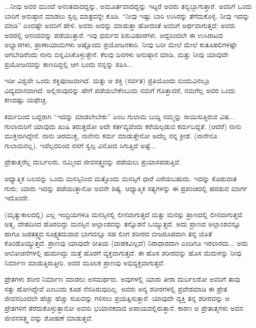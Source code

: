 ...ನೀವು ಅವರ ಮುಂದೆ ಅನಂತವಾದದ್ದನ್ನು, ಅಮೂರ್ತವಾದದ್ದನ್ನು ಇಟ್ಟರೆ ಅವರು ತಬ್ಬಿಬ್ಬಾಗುತ್ತಾರೆ. ಅವರಿಗೆ ಒಂದು ಬಾರಿಗೆ ಅನುಷ್ಠಾನ ಮಾಡಲು ಸ್ವಲ್ಪ ಮಾತ್ರವನ್ನೇ ಕೊಡಿ. “ನೀವು ಇಷ್ಟು ಬಾರಿ ಉಸಿರನ್ನು ತೆಗೆದುಕೊಳ್ಳಿ. ನೀವು ಇದನ್ನು ಮಾಡಿ'' ಎಂದಷ್ಟೇ ಅವರಿಗೆ ಹೇಳಿ. ಅವರು ಅದನ್ನು ಮಾಡುತ್ತಾ ಹೋದಂತೆ ಅವರಿಗೆ ಅರ್ಥವಾಗುತ್ತದೆ; ಅವರು ಅದರಲ್ಲಿ ಆನಂದವನ್ನು ಪಡೆಯುತ್ತಾರೆ. ಇವು ಧರ್ಮದ ಶಿಶುವಿಹಾರಗಳು. ಆದ್ದರಿಂದಲೇ ಈ ಉಸಿರಾಟದ ಅಭ್ಯಾಸಗಳು, ಪ್ರಾಣಾಯಾಮಗಳು ಅಷ್ಟೊಂದು ಪ್ರಯೋಜನಕಾರಿ. ನೀವು ಬರೀ ಮೇಲೆ ಮೇಲೆ ಕುತೂಹಲಿಗಳಷ್ಟೇ ಆಗಬೇಡಿರೆಂದು ನಾನು ಬಿನ್ನವಿಸಿಕೊಳ್ಳುತ್ತೇನೆ. ಕೆಲವು ದಿನಗಳು ಅನುಷ್ಠಾನ ಮಾಡಿ, ಮತ್ತು ನೀವು ಯಾವುದೇ ಪ್ರಯೋಜನವನ್ನು ಕಾಣದಿದ್ದಲ್ಲಿ ಆಗ ಬಂದು ನನ್ನನ್ನು ಶಪಿಸಿ...

\vskip 1.5pt

ಇಡೀ ವಿಶ್ವವೇ ಒಂದು ಶಕ್ತಿಪುಂಜವಾಗಿದೆ. ಮತ್ತು ಆ ಶಕ್ತಿ (ಸರ್ವತ) ಪ್ರತಿಯೊಂದು ಬಿಂದುವಿನಲ್ಲೂ ವಿದ್ಯಮಾನವಾಗಿದೆ. ಅಲ್ಲಿರುವುದನ್ನು ಹೇಗೆ ಪಡೆಯಬೇಕೆಂಬುದು ನಮಗೆ ಗೊತ್ತಾದರೆ, ನಮಗೆಲ್ಲ ಅದರ ಒಂದು ಕಣದಷ್ಟು ಯಥೇಚ್ಛ.

\vskip 1.5pt

ಕರ್ಮದಿಂದ ಬದ್ದರಾಗಿ “ಇದನ್ನು ಮಾಡಲೇಬೇಕು” ಎಂಬ ಗುಲಾಮ ಬುದ್ದಿ ನಮ್ಮನ್ನು ಸಾಯಿಸುತ್ತಿರುವ ವಿಷ... ಗುಲಾಮರಿಗೆ ಯಾವುದು ಖುಷಿ ತರುತ್ತದೋ ಅದೇ ಕರ್ತವ್ಯವೆಂದು ಕರೆಯಲ್ಪಡುವ ಕರ್ಮಬದ್ದತೆ. (ಆದರೆ) ನಾನು ಮುಕ್ತನಾಗಿದ್ದೇನೆ. ನಾನು ಚಿರಮುಕ್ತ, ನಾನೇನು ಕರ್ಮ ಮಾಡುತ್ತೇನೋ ಅದೆಲ್ಲ ನನ್ನ ಕ್ರೀಡೆ. (ನಾನೇನೂ ಗುಲಾಮನಲ್ಲ). ಇವೆಲ್ಲದರಿಂದ ನನಗೆ ಸ್ವಲ್ಪ ವಿನೋದ ಸಿಗುತ್ತಿದೆ ಅಷ್ಟೆ...

\vskip 1.5pt

ಪ್ರೇತಾತ್ಮರೆಲ್ಲ ದುರ್ಬಲರು. ನಮ್ಮಿಂದ ಜೀವಸತ್ತ್ವವನ್ನು ಪಡೆಯಲು ಪ್ರಯಾಸಪಡುತ್ತಿವೆ.

\vskip 1.5pt

ಆಧ್ಯಾತ್ಮಿಕ ಬಲವನ್ನು ಒಂದು ಮನಸ್ಸಿನಿಂದ ಮತ್ತೊಂದು ಮನಸ್ಸಿಗೆ ಧಾರೆ ಎರೆಯಬಹುದು. ಇದನ್ನು ಕೊಡುವಾತ ಗುರು; ಯಾರು ಇದನ್ನು ಪಡೆಯುತ್ತಾನೋ ಅವನೇ ಶಿಷ್ಯ. ಆಧ್ಯಾತ್ಮಿಕ ಸತ್ಯಗಳನ್ನು ಈ ಪ್ರಪಂಚದಲ್ಲಿ ಹರಡುವ ಮಾರ್ಗ ಇದೊಂದೇ.

\vskip 1.5pt

(ಮೃತ್ಯುಕಾಲದಲ್ಲಿ) ಎಲ್ಲ ಇಂದ್ರಿಯಗಳೂ ಮನಸ್ಸಿನಲ್ಲಿ ಲೀನವಾಗುತ್ತದೆ ಮತ್ತು ಮನಸ್ಸು ಪ್ರಾಣದಲ್ಲಿ ಲೀನವಾಗುತ್ತದೆ. ಆತ್ಮ, ದೇಹದಿಂದ ಹೊರಬಿದ್ದು ಮನಸ್ಸಿನ ಅಲ್ಪಾಂಶವನ್ನು ತನ್ನೊಡನೆ ಒಯ್ಯುತ್ತದೆ. ಅದು ಪ್ರಾಣದ ಅಲ್ಪಾಂಶವನ್ನೂ ಹಾಗೂ ಜಡತತ್ತ್ವದ ಸೂಕ್ಷ್ಮತಮವಾದ ಭಾಗವನ್ನೂ ಸಹ ಲಿಂಗ ಶರೀರದ ಬೀಜರೂಪವಾಗಿ ತನ್ನ ಜೊತೆ ಕೊಂಡೊಯ್ಯುತ್ತದೆ. ಪ್ರಾಣವು ಯಾವುದೇ ರೀತಿಯ (ವಾಹಕವಿಲ್ಲದೆ) ನಿರಾಧಾರವಾಗಿ ಎಂದಿಗೂ ಇರಲಾರದು... ಅದು ಆಲೋಚನೆಗಳಲ್ಲಿ ಹುದುಗಿದ್ದು ಮತ್ತೆ ಹೊರಗೆ ವ್ಯಕ್ತವಾಗುತ್ತದೆ. ಈ ಹೊಸ ಶರೀರವನ್ನು ಹೊಸ ಮೆದುಳನ್ನು ನೀವು ನಿರ್ಮಾಣ ಮಾಡುತ್ತಿರುತ್ತೀರಿ. ಅದರ ಮೂಲಕ ಪ್ರಾಣವು ಅಭಿವ್ಯಕ್ತವಾಗುತ್ತದೆ.

\vskip 1.5pt

ಪ್ರೇತಗಳು ಶರೀರ ನಿರ್ಮಾಣ ಮಾಡಲು ಅಸಮರ್ಥರು. ಅವುಗಳಲ್ಲಿ ಯಾರು ತೀರಾ ದುರ್ಬಲರೋ ಅವರಿಗೆ ತಾವು ಸತ್ತು ಹೋಗಿದ್ದೇವೆ ಎಂಬುದು ಕೂಡ ನೆನಪಿರುವುದಿಲ್ಲ. ಅವರು ಅನ್ಯ ಶರೀರಗಳಲ್ಲಿ ಪ್ರವೇಶಮಾಡಿ ಈ ಪ್ರೇತ ಜೀವನದಿಂದಲೇ ಹೆಚ್ಚು ಹೆಚ್ಚು ಸುಖವನ್ನು ಗಳಿಸಲು ಪ್ರಯತ್ನಿಸುತ್ತಾರೆ. ಯಾವುದೇ ವ್ಯಕ್ತಿ ತನ್ನ ಶರೀರವನ್ನು ಆ ಪ್ರೇತಗಳಿಗೆ ತೆರೆದುಕೊಳ್ಳುತ್ತಾನೋ ಅವನು ಭಯಾನಕವಾದ ಅಪಾಯದಲ್ಲಿರುತ್ತಾನೆ. ಕಾರಣ ಆ ಪ್ರೇತಾತ್ಮಗಳು ಅವನ ಜೀವನಸತ್ತ್ವ ವನ್ನು ಶೋಷಣೆ ಮಾಡುತ್ತವೆ.


